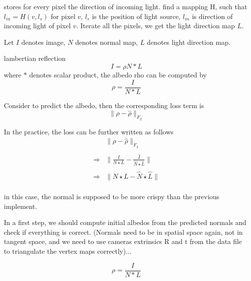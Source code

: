stores for every pixel the direction of incoming light.
find a mapping H, such that $ l_{in} = H(v, l_{s}) $ for pixel $ v $, $ l_s $ is the position of light source, $ l_{in} $ is direction of incoming light of pixel $ v $. Iterate all the pixels, we get the light direction map $ L $.

Let $ I $ denotes image, $ N $ denotes normal map, $ L $ denotes light direction map.

lambertian reflection
\[I = \rho N*L\]
where $ * $ denotes scalar product,
the albedo rho can be computed by 
\[\rho = \frac{I}{N*L}\]

Consider to predict the albedo, then the corresponding loss term is 
\[\|\rho-\hat\rho \|_{F_2}\]

In the practice, the loss can be further written as follows
\begin{equation}
	\begin{array}{cc}
		&\|\rho-\hat\rho \|_{F_2}\\
		\\
		\Rightarrow &  \| \frac{I}{N\star L} - \frac{\hat I}{\hat N \star \hat L} \|\\
		\\
		\Rightarrow &  \| N\star L - \hat N \star \hat L \|\\
	\end{array}
\end{equation}

in this case, the normal is supposed to be more crispy than the previous implement.

In a first step, we should compute initial albedos from the predicted
normals and check if everything is correct. (Normals need to be in
spatial space again, not in tangent space, and we need to use cameras
extrinsics R and t from the data file to triangulate the vertex maps
correctly)...

\[\rho = \frac{I}{N*L}\]




